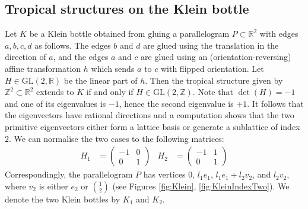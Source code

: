\documentclass[11pt]{article}
\numberwithin{equation}{numsection}
\newcommand{\Z}{{\mathbb Z}}
\newcommand{\R}{{\mathbb R}}
\begin{document}
\subsection{Tropical structures on the Klein bottle} \label{ex:klein}

Let $K$ be a Klein bottle obtained from gluing a parallelogram 
$P \subset \R^2$ with edges $a,b,c,d$ as follows. The edges $b$ and $d$ are glued using the translation in the direction of $a$,
and the edges $a$ and $c$ are glued using an (orientation-reversing) affine transformation $h$ which sends $a$ to $c$ 
with flipped orientation. Let $H \in \text{GL}(2,\R)$ be the linear part of $h$. 
Then the tropical structure given by $\Z^2 \subset \R^2$ extends to $K$ if and only if $H \in \text{GL}(2,\Z)$.
Note that $\det(H) = -1$ and one of its eigenvalues is $-1$, hence the
second eigenvalue is $+1$.  
It follows that the eigenvectors have rational directions and a  computation
shows that the two primitive eigenvectors either form a lattice basis or generate a sublattice of index $2$. 
We can normalise the two cases to the following matrices: 
\begin{align} 
  H_1 &= \begin{pmatrix} -1 & 0 \\ 0 & 1 \end{pmatrix} & H_2 &= \begin{pmatrix} -1 & 1 \\ 0 & 1 \end{pmatrix}
\end{align}
Correspondingly, the parallelogram $P$ has vertices $0$, $l_1 e_1$, $l_1 e_1 + l_2 v_2$, and $l_2 v_2$, where
$v_2$ is either $e_2$ or $\binom{1}{2}$ (see Figures \ref{fig:Klein}, \ref{fig:KleinIndexTwo}). We denote the two Klein bottles
by $K_1$ and $K_2$. 
\end{document}
